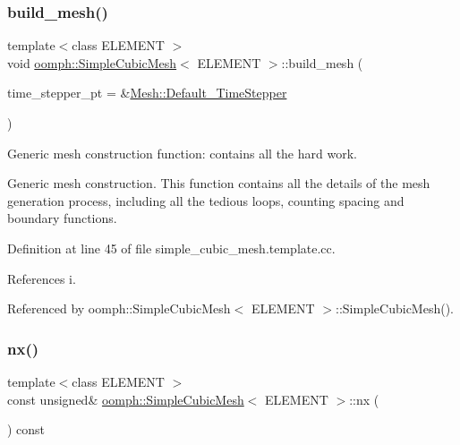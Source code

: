 \subsubsection{\texorpdfstring{build\+\_\+mesh()}{build\_mesh()}}
{\footnotesize\ttfamily template$<$class E\+L\+E\+M\+E\+NT $>$ \\
void \hyperlink{classoomph_1_1SimpleCubicMesh}{oomph\+::\+Simple\+Cubic\+Mesh}$<$ E\+L\+E\+M\+E\+NT $>$\+::build\+\_\+mesh (\begin{DoxyParamCaption}\item[{\hyperlink{classoomph_1_1TimeStepper}{Time\+Stepper} $\ast$}]{time\+\_\+stepper\+\_\+pt = {\ttfamily \&\hyperlink{classoomph_1_1Mesh_a12243d0fee2b1fcee729ee5a4777ea10}{Mesh\+::\+Default\+\_\+\+Time\+Stepper}} }\end{DoxyParamCaption})\hspace{0.3cm}{\ttfamily [protected]}}



Generic mesh construction function\+: contains all the hard work. 

Generic mesh construction. This function contains all the details of the mesh generation process, including all the tedious loops, counting spacing and boundary functions. 

Definition at line 45 of file simple\+\_\+cubic\+\_\+mesh.\+template.\+cc.



References i.



Referenced by oomph\+::\+Simple\+Cubic\+Mesh$<$ E\+L\+E\+M\+E\+N\+T $>$\+::\+Simple\+Cubic\+Mesh().

\mbox{\label{classoomph_1_1SimpleCubicMesh_ad29c917ec0adb29ad24e086e3dcd0b6f}} 
\subsubsection{\texorpdfstring{nx()}{nx()}}
{\footnotesize\ttfamily template$<$class E\+L\+E\+M\+E\+NT $>$ \\
const unsigned\& \hyperlink{classoomph_1_1SimpleCubicMesh}{oomph\+::\+Simple\+Cubic\+Mesh}$<$ E\+L\+E\+M\+E\+NT $>$\+::nx (\begin{DoxyParamCaption}{ }\end{DoxyParamCaption}) const\hspace{0.3cm}{\ttfamily [inline]}}



